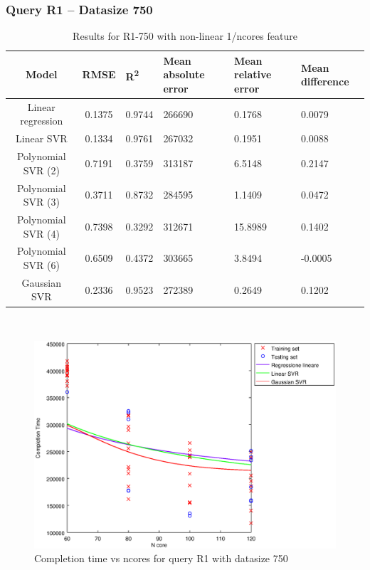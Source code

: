 \documentclass[a4paper,11pt]{article}
\begin{document}
\newpage
\subsubsection{Query R1 -- Datasize 750}
\begin{table}[H]
	\centering
	\begin{adjustbox}{center}
		\begin{tabular}{c | c M{1.2cm} M{2.5cm} M{2.5cm} M{1.8cm}}
			Model & RMSE & R\textsuperscript{2} & Mean absolute error & Mean relative error & Mean difference \tabularnewline
			\hline
			Linear regression & 0.1375 & 0.9744 & 266690 & 0.1768 & 0.0079 \\
			Linear SVR & 0.1334 & 0.9761 & 267032 & 0.1951 & 0.0088 \\
			Polynomial SVR (2) & 0.7191 & 0.3759 & 313187 & 6.5148 & 0.2147 \\
			Polynomial SVR (3) & 0.3711 & 0.8732 & 284595 & 1.1409 & 0.0472 \\
			Polynomial SVR (4) & 0.7398 & 0.3292 & 312671 & 15.8989 & 0.1402 \\
			Polynomial SVR (6) & 0.6509 & 0.4372 & 303665 & 3.8494 & -0.0005 \\
			Gaussian SVR & 0.2336 & 0.9523 & 272389 & 0.2649 & 0.1202 \\
		\end{tabular}
	\end{adjustbox}
	\\
	\caption{Results for R1-750 with non-linear 1/ncores feature}
	\label{table_R1_prediction_all}
\end{table}

\begin {figure}[hbtp]
\centering
\includegraphics[width=\textwidth]{output/R1_750_1_OVER_NCORES/plot_R1_750_bestmodels.eps}
\caption {Completion time vs ncores for query R1 with datasize 750}
\end {figure}
\end{document}
